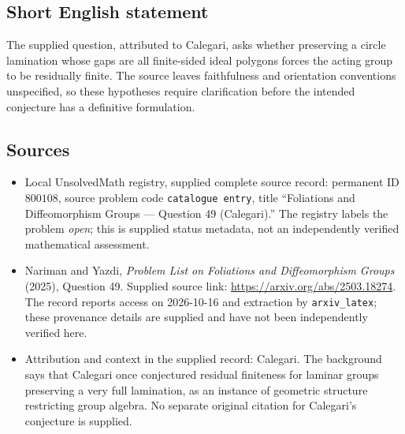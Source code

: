 \documentclass[11pt]{article}
\begin{document}
\subsection{Short English statement}
The supplied question, attributed to Calegari, asks whether preserving a circle lamination whose gaps are all finite-sided ideal polygons forces the acting group to be residually finite. The source leaves faithfulness and orientation conventions unspecified, so these hypotheses require clarification before the intended conjecture has a definitive formulation.
\subsection{Sources}
\begin{itemize}
\item Local UnsolvedMath registry, supplied complete source record: permanent ID \(800108\), source problem code \texttt{catalogue entry}, title ``Foliations and Diffeomorphism Groups --- Question 49 (Calegari).'' The registry labels the problem \emph{open}; this is supplied status metadata, not an independently verified mathematical assessment.
\item Nariman and Yazdi, \emph{Problem List on Foliations and Diffeomorphism Groups} (2025), Question 49. Supplied source link: \url{https://arxiv.org/abs/2503.18274}. The record reports access on 2026-10-16 and extraction by \texttt{arxiv\_latex}; these provenance details are supplied and have not been independently verified here.
\item Attribution and context in the supplied record: Calegari. The background says that Calegari once conjectured residual finiteness for laminar groups preserving a very full lamination, as an instance of geometric structure restricting group algebra. No separate original citation for Calegari's conjecture is supplied.
\end{itemize}
\end{document}
